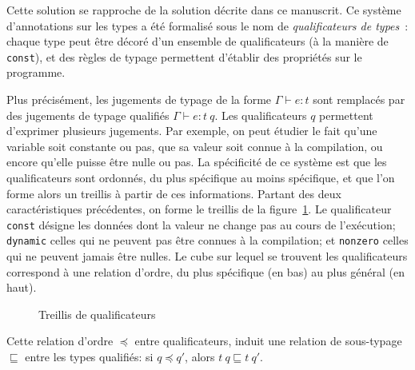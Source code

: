 Cette solution se rapproche de la solution décrite dans ce manuscrit. Ce système
d'annotations sur les types a été formalisé sous le nom de \emph{qualificateurs
de types}~\cite{toplas-quals}: chaque type peut être décoré d'un ensemble de
qualificateurs (à la manière de \texttt{const}), et des règles de typage
permettent d'établir des propriétés sur le programme.

Plus précisément, les jugements de typage de la forme $Γ ⊢ e : t$ sont remplacés
par des jugements de typage qualifiés $Γ ⊢ e : t~q$. Les qualificateurs $q$
permettent d'exprimer plusieurs jugements. Par exemple, on peut étudier le fait
qu'une variable soit constante ou pas, que sa valeur soit connue à la
compilation, ou encore qu'elle puisse être nulle ou pas. La spécificité de ce
système est que les qualificateurs sont ordonnés, du plus spécifique au moins
spécifique, et que l'on forme alors un treillis à partir de ces informations.
Partant des deux caractéristiques précédentes, on forme le treillis de la
figure~\ref{fig:cqual-treillis}. Le qualificateur \texttt{const} désigne les
données dont la valeur ne change pas au cours de l'exécution; \texttt{dynamic}
celles qui ne peuvent pas être connues à la compilation; et \texttt{nonzero}
celles qui ne peuvent jamais être nulles. Le cube sur lequel se trouvent les
qualificateurs correspond à une relation d'ordre, du plus spécifique (en bas) au
plus général (en haut).

\begin{figure}
\centering
{}

\caption{Treillis de qualificateurs}
\label{fig:cqual-treillis}
\end{figure}

Cette relation d'ordre $\preceq$ entre qualificateurs, induit une relation de
sous-typage $\sqsubseteq$ entre les types qualifiés: si $q \preceq q'$, alors
$t~q \sqsubseteq t~q'$.

